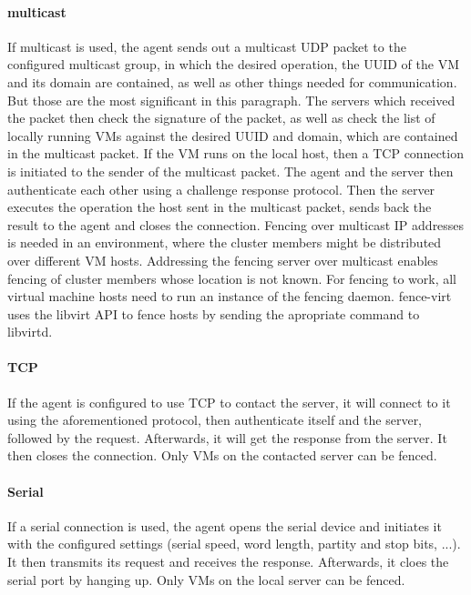 \paragraph{multicast}
If multicast is used, the agent sends out a multicast UDP packet
to the configured multicast group, in which the desired operation, the \ac{UUID}
of the \ac{VM} and its domain are contained, as well as other things needed
for communication. But those are the most significant in this paragraph.
The servers which received the packet then check the signature
of the packet, as well as check the list of locally running \acp{VM} against 
the desired \ac{UUID} and domain, which are contained in the multicast packet.
If the \ac{VM} runs on the local host, then a \ac{TCP} connection
is initiated to the sender of the multicast packet. The agent
and the server then authenticate each other using a challenge response protocol.
Then the server executes the operation the host sent in the multicast packet,
sends back the result to the agent and closes the connection.
Fencing over multicast IP addresses is needed in an environment, where the cluster members might
be distributed over different \ac{VM} hosts. Addressing the fencing server
over multicast enables fencing of cluster members whose location is not known.
For fencing to work, all virtual machine hosts need to run an instance of
the fencing daemon.
fence-virt uses the libvirt \ac{API} to fence hosts by sending the apropriate command to libvirtd.
\paragraph{TCP}
If the agent is configured to use \ac{TCP} to contact the server,
it will connect to it using the aforementioned protocol, then authenticate itself and the server,
followed by the request. Afterwards, it will get the response from the server. It
then closes the connection. Only \acp{VM} on the contacted server can be fenced.
\paragraph{Serial}
If a serial connection is used, the agent opens the serial device and initiates it with the
configured settings (serial speed, word length, partity and stop bits, ...).
It then transmits its request and receives the response. Afterwards, it cloes the
serial port by hanging up. Only \acp{VM} on the local server can be fenced.
